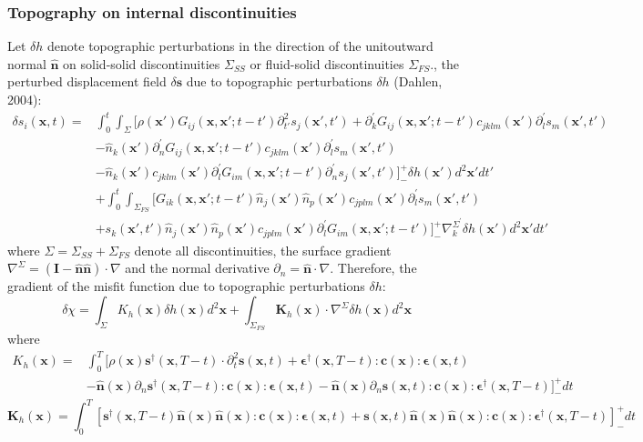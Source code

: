 \documentclass{article}
\newcommand{\mbf}[1]{\mathbf{#1}}
\begin{document}
\subsubsection{Topography on internal discontinuities}
Let $\delta h$ denote topographic perturbations in the direction of the unitoutward normal $\hat{\mbf n}$ on solid-solid discontinuities $\Sigma_{SS}$ or fluid-solid discontinuities $\Sigma_{FS}$., the perturbed displacement field $\delta\mbf s$ due to topographic perturbations $\delta h$ (Dahlen, 2004):
\begin{align*}
  \delta s_i(\mbf x,t)= & \int_0^t\int_\Sigma[\rho(\mbf x')G_{ij}(\mbf x,\mbf x';t-t')\partial_{t'}^2s_j(\mbf x',t')+\partial_k^\prime G_{ij}(\mbf x,\mbf x';t-t')c_{jklm}(\mbf x')\partial_l^\prime s_m(\mbf x',t') \\
    & -\hat{n}_k(\mbf x')\partial_n^\prime G_{ij}(\mbf x,\mbf x';t-t')c_{jklm}(\mbf x')\partial_l^\prime s_m(\mbf x',t') \\
	& -\hat{n}_k(\mbf x')c_{jklm}(\mbf x')\partial_l^\prime G_{im}(\mbf x,\mbf x';t-t')\partial_n^\prime s_j(\mbf x',t')]_-^+\delta h(\mbf x')d^2\mbf x'dt' \\
	& +\int_0^t\int_{\Sigma_{FS}}[G_{ik}(\mbf x,\mbf x';t-t')\hat{n}_j(\mbf x')\hat{n}_p(\mbf x')c_{jplm}(\mbf x')\partial_l^\prime s_m(\mbf x',t') \\
	& +s_k(\mbf x',t')\hat{n}_j(\mbf x')\hat{n}_p(\mbf x')c_{jplm}(\mbf x')\partial_l^\prime G_{im}(\mbf x,\mbf x';t-t')]_-^+\nabla_k^{\Sigma^\prime}\delta h(\mbf x')d^2\mbf x'dt'
\end{align*}
where $\Sigma=\Sigma_{SS}+\Sigma_{FS}$ denote all discontinuities, the surface gradient $\nabla^\Sigma=(\mbf I-\hat{\mbf n}\hat{\mbf n})\cdot\nabla$ and the normal derivative $\partial_n=\hat{\mbf n}\cdot\nabla$. Therefore, the gradient of the misfit function due to topographic perturbations $\delta h$:
\[ \delta\chi=\int_\Sigma K_h(\mbf x)\delta h(\mbf x)d^2\mbf x+\int_{\Sigma_{FS}}\mbf K_h(\mbf x)\cdot\nabla^\Sigma\delta h(\mbf x)d^2\mbf x \]
where
\begin{align*}
  K_h(\mbf x)= & \int_0^T[\rho(\mbf x)\mbf s^\dagger(\mbf x,T-t)\cdot\partial_t^2\mbf s(\mbf x,t)+\mbf\epsilon^\dagger(\mbf x,T-t):\mbf c(\mbf x):\mbf\epsilon(\mbf x,t) \\
    & -\hat{\mbf n}(\mbf x)\partial_n\mbf s^\dagger(\mbf x,T-t):\mbf c(\mbf x):\mbf\epsilon(\mbf x,t)-\hat{\mbf n}(\mbf x)\partial_n\mbf s(\mbf x,t):\mbf c(\mbf x):\mbf\epsilon^\dagger(\mbf x,T-t)]_-^+dt
\end{align*}
\[ \mbf K_h(\mbf x)=\int_0^T[\mbf s^\dagger(\mbf x,T-t)\hat{\mbf n}(\mbf x)\hat{\mbf n}(\mbf x):\mbf c(\mbf x):\mbf\epsilon(\mbf x,t)+\mbf s(\mbf x,t)\hat{\mbf n}(\mbf x)\hat{\mbf n}(\mbf x):\mbf c(\mbf x):\mbf\epsilon^\dagger(\mbf x,T-t)]_-^+dt \]
\end{document}
